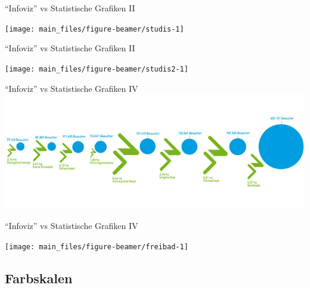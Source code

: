 \documentclass[
  10pt,
  ignorenonframetext,
]{beamer}
\begin{document}
\begin{frame}{``Infoviz'' vs Statistische Grafiken II}
\label{infoviz-vs-statistische-grafiken-ii-1}
\scriptsize

\begin{center}\texttt{[image: main\_files/figure-beamer/studis-1]} \end{center}

\normalsize
\end{frame}

\begin{frame}{``Infoviz'' vs Statistische Grafiken II}
\label{infoviz-vs-statistische-grafiken-ii-2}
\scriptsize

\begin{center}\texttt{[image: main\_files/figure-beamer/studis2-1]} \end{center}

\normalsize
\end{frame}

\begin{frame}{``Infoviz'' vs Statistische Grafiken IV}
\label{infoviz-vs-statistische-grafiken-iv}
\includegraphics[width = \textwidth]{pics/2-freibad.jpg}
\end{frame}

\begin{frame}{``Infoviz'' vs Statistische Grafiken IV}
\label{infoviz-vs-statistische-grafiken-iv-1}
\scriptsize

\begin{center}\texttt{[image: main\_files/figure-beamer/freibad-1]} \end{center}

\normalsize

\scriptsize\normalsize
\end{frame}

\subsection{Farbskalen}\label{farbskalen}
\end{document}
